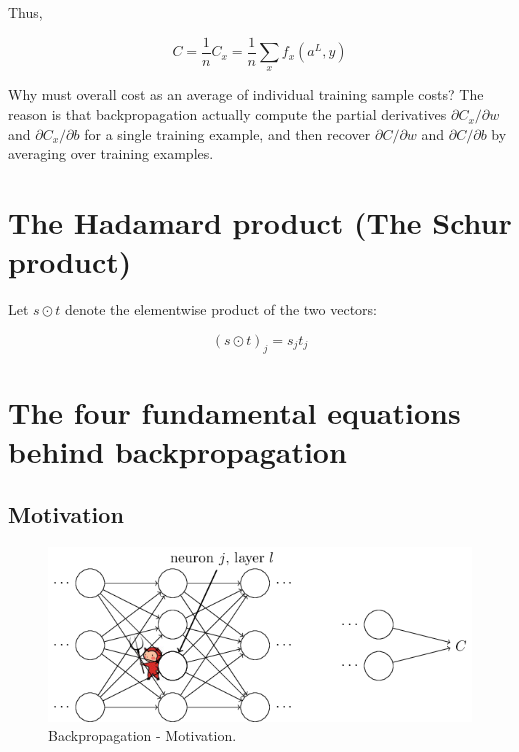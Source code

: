 \documentclass[]{book}
\begin{document}
Thus,

\begin{equation}
C = \frac{1}{n}C_x = \frac{1}{n}\sum_x f_x(a^L, y)
\end{equation}

Why must overall cost as an average of individual training sample costs?
The reason is that backpropagation actually compute the partial
derivatives \(\partial C_x / \partial w\) and
\(\partial C_x / \partial b\) for a single training example, and then
recover \(\partial C / \partial w\) and \(\partial C / \partial b\) by
averaging over training examples.

\section{The Hadamard product (The Schur
product)}\label{the-hadamard-product-the-schur-product}

Let \(s \odot t\) denote the elementwise product of the two vectors:

\begin{equation}
(s \odot t)_j = s_j t_j
\end{equation}

\section{The four fundamental equations behind
backpropagation}\label{the-four-fundamental-equations-behind-backpropagation}

\subsection{Motivation}\label{motivation}

\begin{figure}

{\centering \includegraphics[width=1\linewidth]{fig/02_tikz19} 

}

\caption{Backpropagation - Motivation.}\label{fig:bkpg-demon}
\end{figure}
\end{document}
